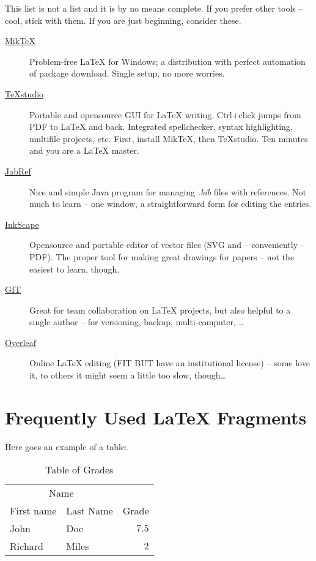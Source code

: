 This list is not a list and it is by no means complete.  If you prefer other tools -- cool, stick with them.  If you are just beginning, consider these.

\begin{description}
	\item[\href{http://miktex.org/download}{MikTeX}] Problem-free \LaTeX{} for Windows; a distribution with perfect automation of package download. Single setup, no more worries.
	\item[\href{http://texstudio.sourceforge.net/}{TeXstudio}] Portable and opensource GUI for \LaTeX{} writing.  Ctrl+click jumps from PDF to \LaTeX{} and back.  Integrated spellchecker, syntax highlighting, multifile projects, etc.  First, install MikTeX, then TeXstudio.  Ten minutes and you are a \LaTeX{} master.
	\item[\href{http://jabref.sourceforge.net/download.php}{JabRef}] Nice and simple Java program for managing \textit{.bib} files with references.  Not much to learn -- one window, a straightforward form for editing the entries.
	\item[\href{https://inkscape.org/en/download/}{InkScape}] Opensource and portable editor of vector files (SVG and -- conveniently -- PDF).  The proper tool for making great drawings for papers -- not the easiest to learn, though.
	\item[\href{https://git-scm.com/}{GIT}] Great for team collaboration on \LaTeX{} projects, but also helpful to a single author -- for versioning, backup, multi-computer, \ldots
	\item[\href{http://www.overleaf.com/edu/but}{Overleaf}] Online \LaTeX{} editing (FIT BUT have an institutional license) -- some love it, to others it might seem a little too slow, though\ldots
\end{description}


\section{Frequently Used \LaTeX{} Fragments}
\label{sec:Fragments}

Here goes an example of a table:
\begin{table}[h]
	\vskip6pt
	\caption{Table of Grades}
	\centering
 	\begin{tabular}{llr}
 		\toprule
 		\multicolumn{2}{c}{Name} \\
		\cmidrule(r){1-2}
 		First name & Last Name & Grade \\
 		\midrule
 		John & Doe & $7.5$ \\
 		Richard & Miles & $2$ \\
 		\bottomrule
 	\end{tabular}
	\label{tab:ExampleTable}
\end{table}

